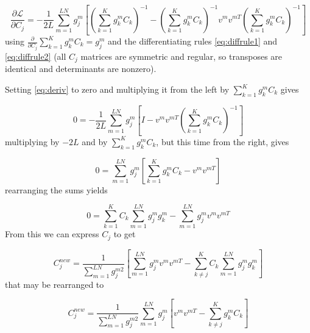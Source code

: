 \documentclass{paper}
\begin{document}
\begin{equation}\label{eq:deriv}
\frac{\partial \mathcal{L}}{\partial C_j} = -\frac{1}{2L} \sum_{m=1}^{LN} g_j^m \left[ \left( \sum_{k=1}^K g_k^m C_k \right)^{-1} - \left( \sum_{k=1}^K g_k^m C_k \right)^{-1} v^m v^{mT} \left( \sum_{k=1}^K g_k^m C_k \right)^{-1} \right]
\end{equation}
%
using $\frac{\partial}{\partial C_j} \sum_{k=1}^K g_k^m C_k = g_j^m$ and the differentiating rules \ref{eq:diffrule1} and \ref{eq:diffrule2} (all $C_j$ matrices are symmetric and regular, so transposes are identical and determinants are nonzero).

Setting  \ref{eq:deriv} to zero and multiplying it from the left by $\sum_{k=1}^K g_k^m C_k$ gives

\begin{equation}\label{eq:zero}
0 =  -\frac{1}{2L} \sum_{m=1}^{LN}  g_j^m \left[ I -  v^m v^{mT} \left( \sum_{k=1}^K g_k^m C_k \right)^{-1} \right]
\end{equation}
%
multiplying by $-2L$ and by $\sum_{k=1}^K g_k^m C_k$, but this time from the right, gives

\begin{equation}
0 = \sum_{m=1}^{LN} g_j^m \left[ \sum_{k=1}^K g_k^m C_k - v^m v^{mT} \right]
\end{equation}
%
rearranging the sums yields

\begin{equation}
0 =  \sum_{k=1}^K C_k \sum_{m=1}^{LN} g_j^m g_k^m  - \sum_{m=1}^{LN} g_j^m v^m v^{mT}
\end{equation}
%
From this we can express $C_j$ to get

\begin{equation}
C_j^{new} = \frac{1}{\sum_{m=1}^{LN} g_j^{m2}} \left[ \sum_{m=1}^{LN} g_j^m v^m v^{mT} - \sum_{k \neq j}^K C_k \sum_{m=1}^{LN} g_j^m g_k^m \right]
\end{equation}
%
that may be rearranged to

\begin{equation}
C_j^{new} = \frac{1}{\sum_{m=1}^{LN} g_j^{m2}} \sum_{m=1}^{LN} g_j^m \left[ v^m v^{mT} - \sum_{k \neq j}^K g_k^m C_k \right]
\end{equation}
\end{document}
